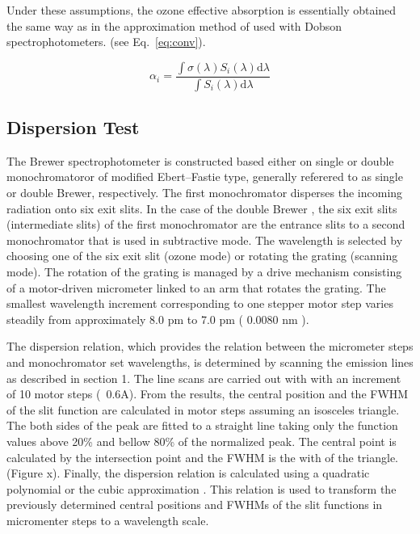 \documentclass[acp]{copernicus} %
\begin{document}
Under these assumptions, the ozone effective absorption is essentially obtained the same way as in the approximation method of \citet{Bernhard2005} used with Dobson spectrophotometers. (see Eq.~\ref{eq:conv}).


      \begin{equation}
      \label{eq:conv}
            \alpha_i = \frac{\int \sigma(\lambda) S_i(\lambda) \mbox{d}\lambda}{\int S_i(\lambda) \mbox{d}\lambda}
      \end{equation}


\subsection{Dispersion Test}

The Brewer spectrophotometer is constructed based either on single or double monochromatoror of modified Ebert–Fastie type, generally referered to as single or double Brewer, respectively. The first monochromator disperses the incoming radiation onto six exit slits. In the case of the double Brewer , the six exit slits  (intermediate slits) of the first monochromator are the entrance slits to a second monochromator that is used in subtractive mode. The wavelength is selected by choosing one of the six exit slit (ozone mode) or rotating the grating (scanning mode). The rotation of the grating is managed by a drive mechanism consisting of a motor-driven micrometer linked to an arm that rotates the grating. The smallest wavelength increment corresponding to one stepper motor step varies steadily from approximately 8.0 pm to 7.0 pm ( 0.0080 \unit{nm} ). 

The dispersion relation, which provides the  relation between the micrometer steps and monochromator set wavelengths, is determined by scanning the emission lines as described in section 1. The line scans are carried out with with an increment of 10 motor steps (~0.6A). From the results, the central position and the FWHM of the slit function are calculated in  motor steps assuming an isosceles triangle. The both sides of the peak are  fitted to a straight line taking only the function values above 20\%  and bellow 80\% of the normalized peak. The central point is calculated by the intersection point and the FWHM is the with of the triangle. (Figure x). Finally, the dispersion relation is calculated using a quadratic polynomial or the cubic approximation \citep{Grobner1998}. This relation is used to transform the previously determined central positions and FWHMs of the slit functions in micromenter steps to a wavelength scale.
\end{document}
